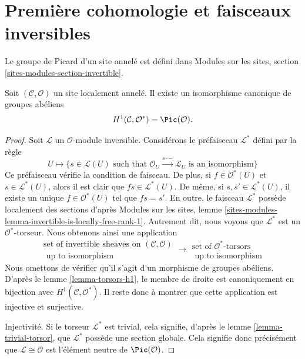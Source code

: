 \section{Première cohomologie et faisceaux inversibles}
\label{section-invertible-sheaves}

\noindent
Le groupe de Picard d'un site annelé est défini dans
Modules sur les sites, section \ref{sites-modules-section-invertible}.

\begin{lemma}
\label{lemma-h1-invertible}
Soit $(\mathcal{C}, \mathcal{O})$ un site localement annelé.
Il existe un isomorphisme canonique de groupes abéliens
$$
H^1(\mathcal{C}, \mathcal{O}^*) = \Pic(\mathcal{O}).
$$

\end{lemma}

\begin{proof}
Soit $\mathcal{L}$ un $\mathcal{O}$-module inversible.
Considérons le préfaisceau $\mathcal{L}^*$ défini par la règle
$$
U \longmapsto \{s \in \mathcal{L}(U)
\text{ such that } \mathcal{O}_U \xrightarrow{s \cdot -} \mathcal{L}_U
\text{ is an isomorphism}\}
$$
Ce préfaisceau vérifie la condition de faisceau. De plus, si
$f \in \mathcal{O}^*(U)$ et $s \in \mathcal{L}^*(U)$, alors il est clair que
$fs \in \mathcal{L}^*(U)$. De même, si $s, s' \in \mathcal{L}^*(U)$,
il existe un unique $f \in \mathcal{O}^*(U)$ tel que
$fs = s'$. En outre, le faisceau $\mathcal{L}^*$ possède localement des sections
d'après Modules sur les sites, lemme
\ref{sites-modules-lemma-invertible-is-locally-free-rank-1}.
Autrement dit, nous
voyons que $\mathcal{L}^*$ est un $\mathcal{O}^*$-torseur. Nous obtenons ainsi
une application
$$
\begin{matrix}
\text{set of invertible sheaves on }(\mathcal{C}, \mathcal{O}) \\
\text{ up to isomorphism}
\end{matrix}
\longrightarrow
\begin{matrix}
\text{set of }\mathcal{O}^*\text{-torsors} \\
\text{ up to isomorphism}
\end{matrix}
$$
Nous omettons de vérifier qu'il s'agit d'un morphisme de groupes abéliens.
D'après le
lemme \ref{lemma-torsors-h1},
le membre de droite est canoniquement
en bijection avec $H^1(\mathcal{C}, \mathcal{O}^*)$.
Il reste donc à montrer que cette application est injective et surjective.

\medskip\noindent
Injectivité. Si le torseur $\mathcal{L}^*$ est trivial, cela signifie, d'après le
lemme \ref{lemma-trivial-torsor},
que $\mathcal{L}^*$ possède une section globale.
Cela signifie donc précisément que $\mathcal{L} \cong \mathcal{O}$ est
l'élément neutre de $\Pic(\mathcal{O})$.


\end{proof}
